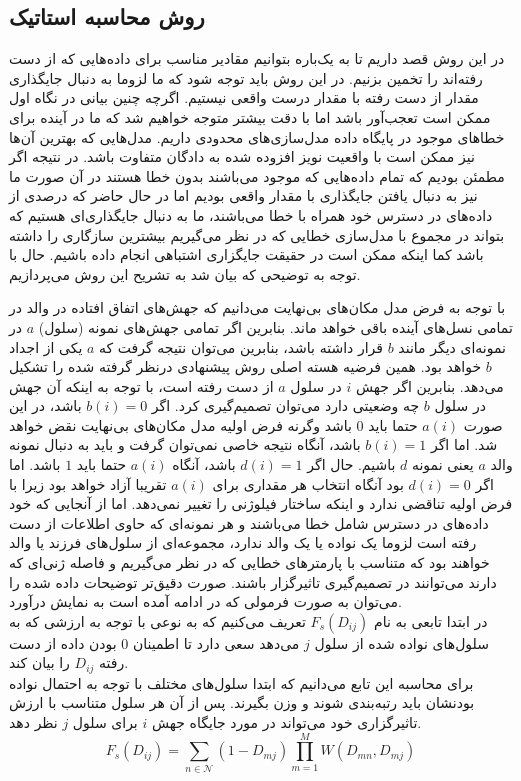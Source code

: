\subsection{روش محاسبه استاتیک}
در این روش قصد داریم تا به یک‌باره بتوانیم مقادیر مناسب برای داده‌هایی که از دست رفته‌اند را تخمین بزنیم. در این روش باید توجه شود که ما لزوما به دنبال جایگذاری مقدار از دست رفته با مقدار درست واقعی نیستیم. اگرچه چنین بیانی در نگاه اول ممکن است تعجب‌آور باشد اما با دقت بیشتر متوجه خواهیم شد که ما در آینده برای خطاهای موجود در پایگاه داده مدل‌سازی‌های محدودی داریم. مدل‌هایی که بهترین آن‌ها نیز ممکن است با واقعیت نویز افزوده شده به دادگان متفاوت باشد. در نتیجه اگر مطمئن بودیم که تمام داده‌هایی که موجود می‌باشند بدون خطا هستند در آن صورت ما نیز به دنبال یافتن جایگذاری با مقدار واقعی بودیم اما در حال حاضر که درصدی از داده‌های در دسترس خود همراه با خطا می‌باشند، ما به دنبال جایگذاری‌ای هستیم که بتواند در مجموع با مدل‌سازی خطایی که در نظر می‌گیریم بیشترین سازگاری را داشته باشد کما اینکه ممکن است در حقیقت جایگزاری اشتباهی انجام داده باشیم. حال با توجه به توضیحی که بیان شد به تشریح این روش می‌پردازیم.

با توجه به فرض مدل مکان‌های بی‌نهایت می‌دانیم که جهش‌های اتفاق افتاده در والد در تمامی نسل‌های آینده باقی خواهد ماند. بنابرین اگر تمامی جهش‌های نمونه (سلول) $a$ در نمونه‌ای دیگر مانند $b$ قرار داشته باشد، بنابرین می‌توان نتیجه گرفت که $a$ یکی از اجداد $b$ خواهد بود. همین فرضیه هسته اصلی روش پیشنهادی درنظر گرفته شده را تشکیل می‌دهد. بنابرین اگر جهش $i$ در سلول $a$ از دست رفته است، با توجه به اینکه آن جهش در سلول $b$ چه وضعیتی دارد می‌توان تصمیم‌گیری کرد. اگر $b(i)=0$ باشد، در این صورت $a(i)$ حتما باید $0$ باشد وگرنه فرض اولیه مدل مکان‌های بی‌نهایت نقض خواهد شد. اما اگر $b(i)=1$ باشد، آنگاه نتیجه خاصی نمی‌توان گرفت و باید به دنبال نمونه والد $a$ یعنی نمونه $d$ باشیم. حال اگر $d(i)=1$ باشد، آنگاه $a(i)$ حتما باید $1$ باشد. اما اگر $d(i)=0$ بود آنگاه انتخاب هر مقداری برای $a(i)$ تقریبا آزاد خواهد بود زیرا با فرض اولیه تناقضی ندارد و اینکه ساختار فیلوژنی را تغییر نمی‌دهد. اما از آنجایی که  خود داده‌های در دسترس شامل خطا می‌باشند و هر نمونه‌ای که حاوی اطلاعات از دست رفته است لزوما یک نواده یا یک والد ندارد، مجموعه‌ای از سلول‌های فرزند یا والد خواهند بود که متناسب با پارمترهای خطایی که در نظر می‌گیریم و فاصله ژنی‌ای که دارند می‌توانند در تصمیم‌گیری تاثیرگزار باشند. صورت دقیق‌تر توضیحات داده شده را می‌توان به صورت فرمولی که در ادامه آمده است به نمایش درآورد.
\\
در ابتدا تابعی به نام $F_s(D_{ij})$ تعریف می‌کنیم که به نوعی با توجه به ارزشی که به سلول‌های نواده شده از سلول $j$ می‌دهد سعی دارد تا اطمینان $0$ بودن داده از دست رفته $D_{ij}$ را بیان کند.
\\
برای محاسبه این تابع می‌دانیم که ابتدا سلول‌های مختلف با توجه به احتمال نواده بودنشان باید رتبه‌بندی شوند و وزن بگیرند. پس از آن  هر سلول متناسب با ارزش تاثیرگزاری خود می‌تواند در مورد جایگاه جهش $i$ برای سلول $j$ نظر دهد.
\begin{equation}
	F_s(D_{ij}) = \sum_{n \in \mathcal{N}}  (1-D_{mj})  \prod_{m=1}^{M} W(D_{mn}, D_{mj})
	\label{eq:ch_pm:F_s_simple}
\end{equation}

